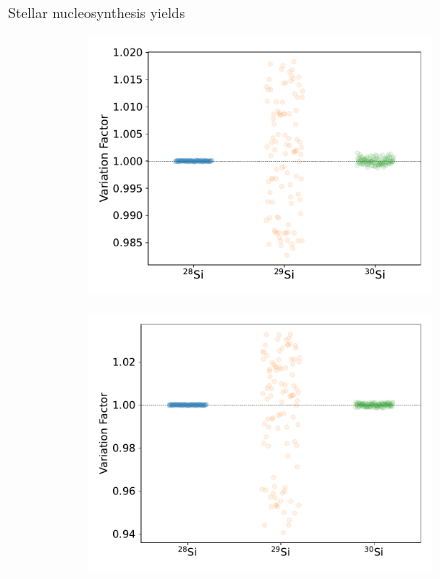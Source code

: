 \documentclass[10pt]{beamer}
\begin{document}
\begin{frame}{Stellar nucleosynthesis yields}
        \begin{figure}
        \begin{subfigure}[b]{0.42\textwidth}
            \includegraphics[width=\textwidth]{figs/M15Z2E-2_mcyieldresult.pdf}
        \end{subfigure}
        \begin{subfigure}[b]{0.42\textwidth}
            \includegraphics[width=\textwidth]{figs/M15Z1E-2_mcyieldresult.pdf}
        \end{subfigure}
        

\end{figure}
\end{frame}
\end{document}
